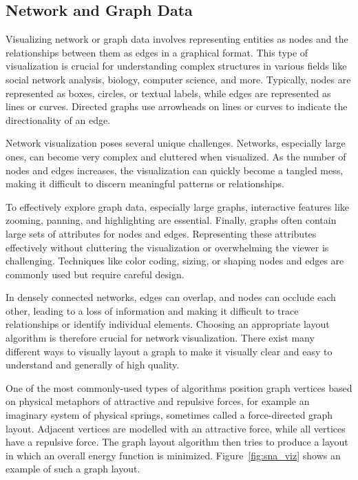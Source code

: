 \subsection*{Network and Graph Data}

Visualizing network or graph data involves representing entities as nodes and the relationships between them as edges in a graphical format. This type of visualization is crucial for understanding complex structures in various fields like social network analysis, biology, computer science, and more. Typically, nodes are represented as boxes, circles, or textual labels, while edges are represented as lines or curves. Directed graphs use arrowheads on lines or curves to indicate the directionality of an edge. 

Network visualization poses several unique challenges. Networks, especially large ones, can become very complex and cluttered when visualized. As the number of nodes and edges increases, the visualization can quickly become a tangled mess, making it difficult to discern meaningful patterns or relationships.

To effectively explore graph data, especially large graphs, interactive features like zooming, panning, and highlighting are essential. Finally, graphs often contain large sets of attributes for nodes and edges. Representing these attributes effectively without cluttering the visualization or overwhelming the viewer is challenging. Techniques like color coding, sizing, or shaping nodes and edges are commonly used but require careful design.

In densely connected networks, edges can overlap, and nodes can occlude each other, leading to a loss of information and making it difficult to trace relationships or identify individual elements. Choosing an appropriate layout algorithm is therefore crucial for network visualization. There exist many different ways to visually layout a graph to make it visually clear and easy to understand and generally of high quality. 

One of the most commonly-used types of algorithms position graph vertices based on physical metaphors of attractive and repulsive forces, for example an imaginary system of physical springs, sometimes called a force-directed graph layout. Adjacent vertices are modelled with an attractive force, while all vertices have a repulsive force. The graph layout algorithm then tries to produce a layout in which an overall energy function is minimized. Figure~\ref{fig:sna_viz} shows an example of such a graph layout.

